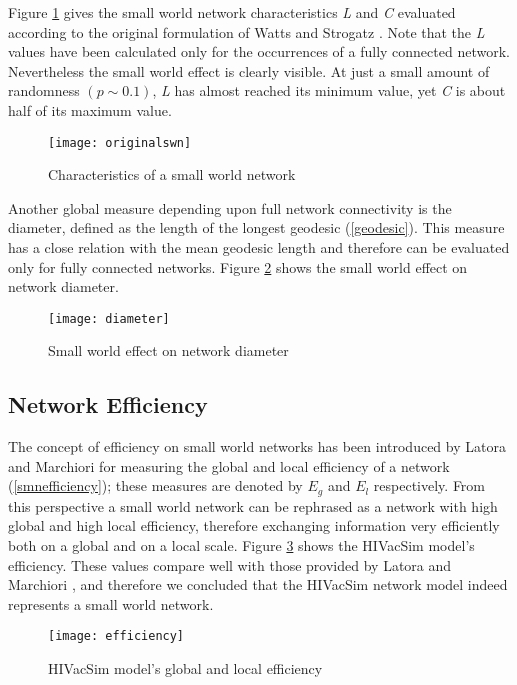 Figure \ref{originalswn} gives the small world network characteristics \emph{L} and
\emph{C} evaluated according to the original formulation of Watts and Strogatz
\cite{Watts1998}. Note that the \emph{L} values have been calculated only for the
occurrences of a fully connected network. Nevertheless the small world effect is clearly
visible. At just a small amount of randomness $(p \sim 0.1)$, \emph{L} has almost reached
its minimum value, yet \emph{C} is about half of its maximum value.
\begin{figure}[ht]
\begin{center}
\texttt{[image: originalswn]}
\caption{Characteristics of a small world network} \label{originalswn}
\end{center}
\end{figure}

Another global measure depending upon full network connectivity is the diameter, defined
as the length of the longest geodesic (\ref{geodesic}). This measure has a close relation
with the mean geodesic length and therefore can be evaluated only for fully connected
networks. Figure \ref{diameter} shows the small world effect on network diameter.
\begin{figure}[!h]
\texttt{[image: diameter]}
\caption{Small world effect on network diameter} \label{diameter}
\end{figure}

\subsection{Network Efficiency}\label{netefficiency}

The concept of efficiency on small world networks has been introduced by Latora and
Marchiori \cite{Latora2001} for measuring the global and local efficiency of a network
(\ref{smnefficiency}); these measures are denoted by $E_g$ and $E_l$ respectively. From
this perspective a small world network can be rephrased as a network with high global and
high local efficiency, therefore exchanging information very efficiently both on a global
and on a local scale. Figure \ref{efficiency} shows the HIVacSim model's efficiency.
These values compare well with those provided by Latora and Marchiori \cite{Latora2001},
and therefore we concluded that the HIVacSim network model indeed represents a small
world network.
\begin{figure}[h]
\texttt{[image: efficiency]}
\caption{HIVacSim model's global and local efficiency} \label{efficiency}
\end{figure}

